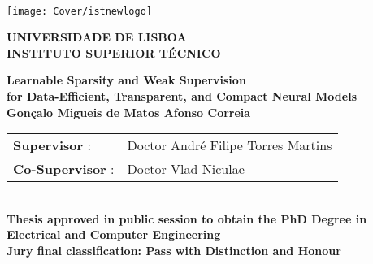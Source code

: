 \setcounter{page}{1} 


\thispagestyle{empty}
\begin{flushleft} ~\\ \vspace{-12mm} \hspace{-12mm}  \texttt{[image: Cover/istnewlogo]}

    \centering
    \Large \textbf{UNIVERSIDADE DE LISBOA \\ INSTITUTO SUPERIOR TÉCNICO}
    \vspace{12mm}


    \centering
    \Large \textbf{Learnable Sparsity and Weak Supervision\\for Data-Efficient, Transparent, and Compact Neural Models}
    \\ \vspace{10mm}  %
    \Large \textbf{Gonçalo Migueis de Matos Afonso Correia} \\
    \vspace{12mm}

    \large %
    \begin{minipage}{\textwidth}
        \hspace{15mm}
        \begin{tabularx}{\textwidth}{ l @{ } l }
            \centering
            \textbf{Supervisor} :    & Doctor André Filipe Torres Martins \\
            \textbf{Co-Supervisor} : & Doctor Vlad Niculae                \\
        \end{tabularx}
    \end{minipage}
    \\ \vspace{12mm}
    \centering
    \large \textbf{Thesis approved in public session to obtain the PhD Degree in}\\
    \large \textbf{Electrical and Computer Engineering}\\
    \vspace{5mm}
    \large \textbf{Jury final classification:  Pass with Distinction and Honour}\\
    \vspace{15mm}


\end{flushleft}
